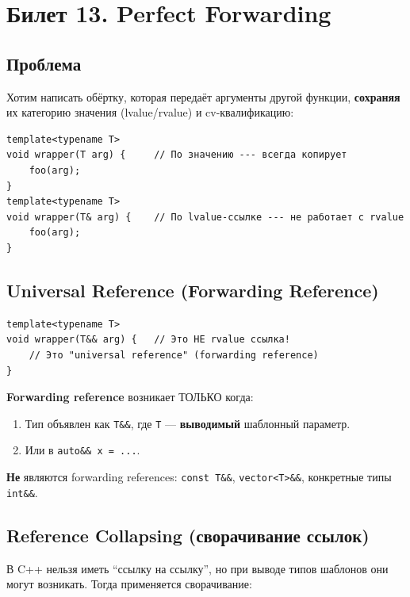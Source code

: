 \documentclass[12pt,a4paper]{article}
\begin{document}
\section{Билет 13. Perfect Forwarding}

\subsection{Проблема}

Хотим написать обёртку, которая передаёт аргументы другой функции, \textbf{сохраняя} их категорию значения (lvalue/rvalue) и cv-квалификацию:

\begin{lstlisting}
template<typename T>
void wrapper(T arg) {     // По значению --- всегда копирует
    foo(arg);
}
template<typename T>
void wrapper(T& arg) {    // По lvalue-ссылке --- не работает с rvalue
    foo(arg);
}
\end{lstlisting}

\subsection{Universal Reference (Forwarding Reference)}

\begin{lstlisting}
template<typename T>
void wrapper(T&& arg) {   // Это НЕ rvalue ссылка!
    // Это "universal reference" (forwarding reference)
}
\end{lstlisting}

\textbf{Forwarding reference} возникает ТОЛЬКО когда:
\begin{enumerate}
    \item Тип объявлен как \texttt{T\&\&}, где \texttt{T} --- \textbf{выводимый} шаблонный параметр.
    \item Или в \texttt{auto\&\& x = ...}.
\end{enumerate}

\textbf{Не} являются forwarding references: \texttt{const T\&\&}, \texttt{vector<T>\&\&}, конкретные типы \texttt{int\&\&}.

\subsection{Reference Collapsing (сворачивание ссылок)}

В C++ нельзя иметь ``ссылку на ссылку'', но при выводе типов шаблонов они могут возникать. Тогда применяется сворачивание:
\end{document}
